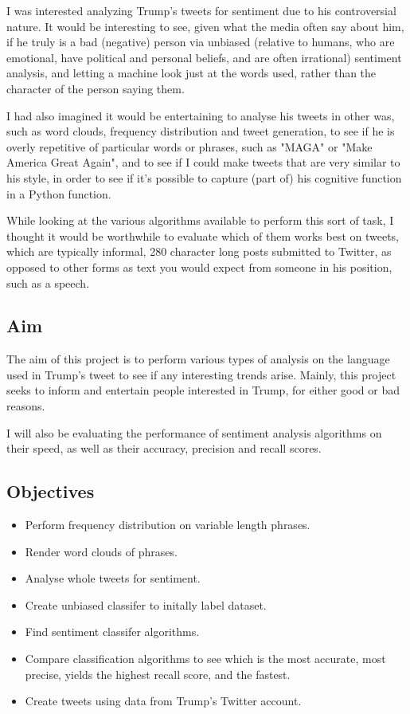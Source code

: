 \documentclass{article}
\begin{document}
I was interested analyzing Trump's tweets for sentiment due to his controversial nature.
It would be interesting to see, given what the media often say about him, if he truly is a bad (negative) person via unbiased (relative to humans, who are emotional, have political and personal beliefs, and are often irrational) sentiment analysis, and letting a machine look just at the words used, rather than the character of the person saying them.

I had also imagined it would be entertaining to analyse his tweets in other was, such as word clouds, frequency distribution and tweet generation, to see if he is overly repetitive of particular words or phrases, such as "MAGA" or "Make America Great Again", and to see if I could make tweets that are very similar to his style, in order to see if it's possible to capture (part of) his cognitive function in a Python function.

While looking at the various algorithms available to perform this sort of task, I thought it would be worthwhile to evaluate which of them works best on tweets, which are typically informal, 280 character long posts submitted to Twitter, as opposed to other forms as text you would expect from someone in his position, such as a speech.

\subsection{Aim}

The aim of this project is to perform various types of analysis on the language used in Trump's tweet to see if any interesting trends arise.
Mainly, this project seeks to inform and entertain people interested in Trump, for either good or bad reasons.

I will also be evaluating the performance of sentiment analysis algorithms on their speed, as well as their accuracy, precision and recall scores.

\subsection{Objectives}

\begin{itemize}
	\item Perform frequency distribution on variable length phrases.
	\item Render word clouds of phrases.
	\item Analyse whole tweets for sentiment.
	\item Create unbiased classifer to initally label dataset.
	\item Find sentiment classifer algorithms.
	\item Compare classification algorithms to see which is the most accurate, most precise, yields the highest recall score, and the fastest.
	\item Create tweets using data from Trump's Twitter account.
\end{itemize}
	
\end{document}
